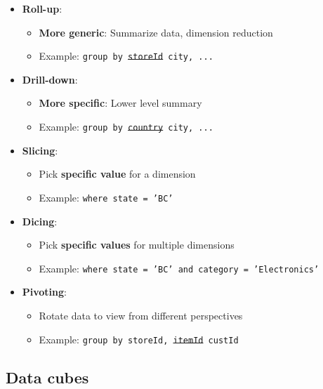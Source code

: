 \begin{theorem}
    \begin{itemize}
        \item \textbf{Roll-up}:
              \begin{itemize}
                  \item \textbf{More generic}: Summarize data, dimension reduction
                  \item Example: \texttt{group by \st{storeId} city, ...}
              \end{itemize}
        \item \textbf{Drill-down}:
              \begin{itemize}
                  \item \textbf{More specific}: Lower level summary
                  \item Example: \texttt{group by \st{country} city, ...}
              \end{itemize}
        \item \textbf{Slicing}:
              \begin{itemize}
                  \item Pick \textbf{specific value} for a dimension
                  \item Example: \texttt{where state = 'BC'}
              \end{itemize}
        \item \textbf{Dicing}:
              \begin{itemize}
                  \item Pick \textbf{specific values} for multiple dimensions
                  \item Example: \texttt{where state = 'BC' and category = 'Electronics'}
              \end{itemize}
        \item \textbf{Pivoting}:
              \begin{itemize}
                  \item Rotate data to view from different perspectives
                  \item Example: \texttt{group by storeId, \st{itemId} custId }
              \end{itemize}
    \end{itemize}
\end{theorem}

\subsection{Data cubes}

